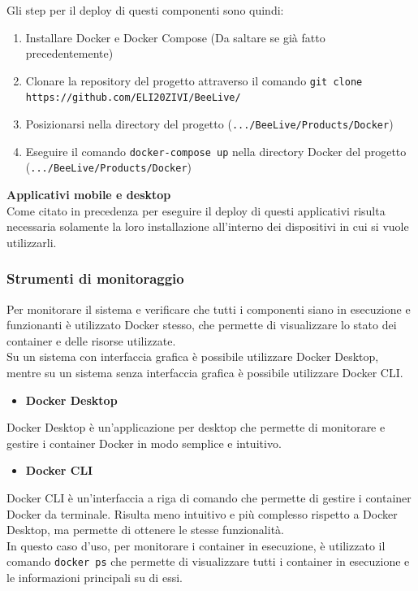 \documentclass{article}
\begin{document}
\noindent Gli step per il deploy di questi componenti sono quindi:
\begin{enumerate}
    \item Installare Docker e Docker Compose (Da saltare se già fatto precedentemente)
    \item Clonare la repository del progetto attraverso il comando \texttt{git clone https://github.com/ELI20ZIVI/BeeLive/}
    \item Posizionarsi nella directory del progetto (\texttt{.../BeeLive/Products/Docker})
    \item Eseguire il comando \texttt{docker-compose up} nella directory Docker del progetto (\texttt{.../BeeLive/Products/Docker})
\end{enumerate}

\noindent\textbf{Applicativi mobile e desktop}\\
Come citato in precedenza per eseguire il deploy di questi applicativi risulta necessaria solamente la loro installazione all'interno dei dispositivi in cui si vuole utilizzarli.

\subsubsection{Strumenti di monitoraggio}
Per monitorare il sistema e verificare che tutti i componenti siano in esecuzione e funzionanti è utilizzato Docker stesso, che permette di visualizzare lo stato dei container e delle risorse utilizzate.\\
Su un sistema con interfaccia grafica è possibile utilizzare Docker Desktop, mentre su un sistema senza interfaccia grafica è possibile utilizzare Docker CLI.
\begin{itemize}
    \item \textbf{Docker Desktop}
\end{itemize}
Docker Desktop è un'applicazione per desktop che permette di monitorare e gestire i container Docker in modo semplice e intuitivo.
\begin{itemize}
    \item \textbf{Docker CLI}
\end{itemize}
Docker CLI è un'interfaccia a riga di comando che permette di gestire i container Docker da terminale. Risulta meno intuitivo e più complesso rispetto a Docker Desktop, ma permette di ottenere le stesse funzionalità.\\
In questo caso d'uso, per monitorare i container in esecuzione, è utilizzato il comando \texttt{docker ps} che permette di visualizzare tutti i container in esecuzione e le informazioni principali su di essi.
\end{document}
